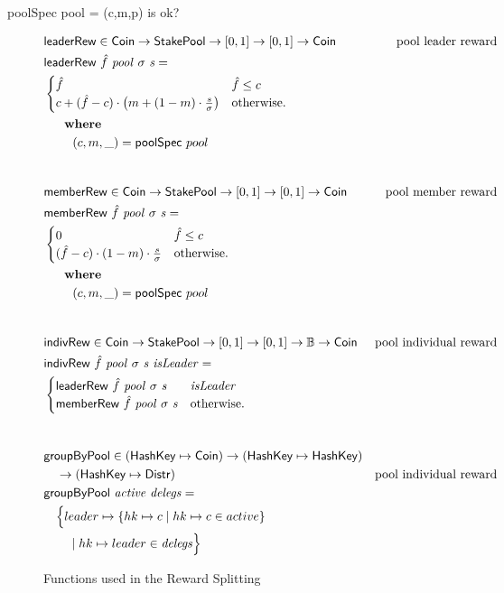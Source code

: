 \begin{todo}
  poolSpec pool = (c,m,p) is ok?
\end{todo}
\begin{figure}[htb]
  \begin{align*}
      & \fun{leaderRew} \in \Coin \to \StakePool \to [0, 1] \to [0, 1] \to \Coin
      & \text{pool leader reward} \\
      & \fun{leaderRew}~\hat{f}~\var{pool}~\sigma~\var{s} = \\
      & \begin{cases}
          \hat{f} & \hat{f} \leq c\\
          c + (\hat{f} - c)\cdot\left(m + (1-m)\cdot\frac{s}{\sigma}\right) &
          \text{otherwise.}
        \end{cases} \\
      & ~~~\where \\
      & ~~~~~~~(c, m, \_) = \fun{poolSpec}~pool \\
      \nextdef
      & \fun{memberRew} \in \Coin \to \StakePool \to [0, 1] \to [0, 1] \to \Coin
      & \text{pool member reward} \\
      & \fun{memberRew}~\hat{f}~\var{pool}~\sigma~\var{s} = \\
      & \begin{cases}
          0 & \hat{f} \leq c\\
          (\hat{f} - c)\cdot(1-m)\cdot\frac{s}{\sigma} &
          \text{otherwise.}
        \end{cases} \\
      & ~~~\where \\
      & ~~~~~~~(c, m, \_) = \fun{poolSpec}~pool \\
      \nextdef
      & \fun{indivRew} \in \Coin \to \StakePool \to [0, 1] \to [0, 1] \to \mathbb{B} \to \Coin
      & \text{pool individual reward} \\
      & \fun{indivRew}~\hat{f}~\var{pool}~\sigma~\var{s}~\var{isLeader} = \\
      & \begin{cases}
          \fun{leaderRew}~\hat{f}~\var{pool}~\sigma~\var{s} & \var{isLeader} \\
        \fun{memberRew}~\hat{f}~\var{pool}~\sigma~\var{s} & \text{otherwise.}
        \end{cases} \\
      \nextdef
      & \fun{groupByPool} \in (\HashKey \mapsto \Coin) \to (\HashKey \mapsto \HashKey) \\
      & ~~~\to (\HashKey \mapsto \Distr)
      & \text{pool individual reward} \\
      & \fun{groupByPool}~\var{active}~\var{delegs} = \\
      & ~~~\Big\{ leader \mapsto
      \{hk \mapsto c \mid hk \mapsto c \in active\} \\
      & ~~~~~~            \mid hk \mapsto leader\in\var{delegs} \Big\}
  \end{align*}
  \caption{Functions used in the Reward Splitting}
  \label{fig:functions:reward-splitting}
\end{figure}


